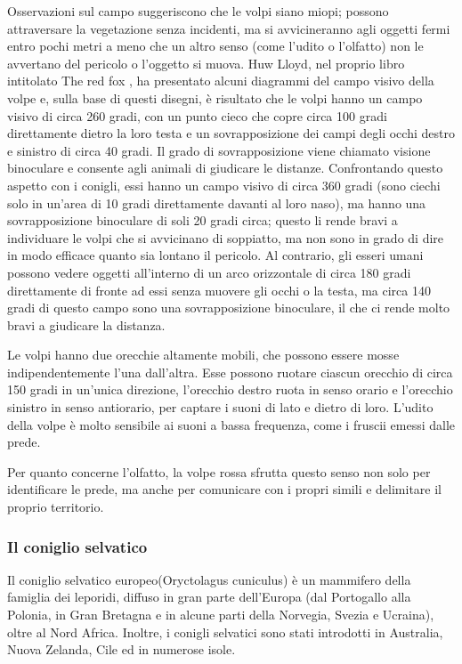 \documentclass[11pt]{article}
\begin{document}
Osservazioni sul campo\cite{RedFox} suggeriscono che le volpi siano miopi; possono attraversare la vegetazione senza incidenti, ma si avvicineranno agli oggetti fermi entro pochi metri a meno che un altro senso (come l'udito o l'olfatto) non le avvertano del pericolo o l'oggetto si muova. Huw Lloyd, nel proprio libro intitolato The red fox \cite{Zimen1980}, ha presentato alcuni diagrammi del campo visivo della volpe e, sulla base di questi disegni, è risultato che le volpi hanno un campo visivo di circa 260 gradi, con un punto cieco che copre circa 100 gradi direttamente dietro la loro testa e un sovrapposizione dei campi degli occhi destro e sinistro di circa 40 gradi. Il grado di sovrapposizione viene chiamato visione binoculare e consente agli animali di giudicare le distanze.
Confrontando questo aspetto con i conigli, essi hanno un campo visivo di circa 360 gradi (sono ciechi solo in un'area di 10 gradi direttamente davanti al loro naso), ma hanno una sovrapposizione binoculare di soli 20 gradi circa; questo li rende bravi a individuare le volpi che si avvicinano di soppiatto, ma non sono in grado di dire in modo efficace quanto sia lontano il pericolo. Al contrario, gli esseri umani possono vedere oggetti all'interno di un arco orizzontale di circa 180 gradi direttamente di fronte ad essi senza muovere gli occhi o la testa, ma circa 140 gradi di questo campo sono una sovrapposizione binoculare, il che ci rende molto bravi a giudicare la distanza.

Le volpi hanno due orecchie altamente mobili, che possono essere mosse indipendentemente l'una dall'altra. Esse possono ruotare ciascun orecchio di circa 150 gradi in un'unica direzione, l'orecchio destro ruota in senso orario e l'orecchio sinistro in senso antiorario, per captare i suoni di lato e dietro di loro. L'udito della volpe è molto sensibile ai suoni a bassa frequenza, come i fruscii emessi dalle prede. 

Per quanto concerne l'olfatto, la volpe rossa sfrutta questo senso non solo per identificare le prede, ma anche per comunicare con i propri simili e delimitare il proprio territorio.



\subsubsection{Il coniglio selvatico}
\label{coniglio}
Il coniglio selvatico\cite{WikiConiglio} europeo(Oryctolagus cuniculus) è un mammifero della famiglia dei leporidi, diffuso in gran parte dell'Europa (dal Portogallo alla Polonia, in Gran Bretagna e in alcune parti della Norvegia, Svezia e Ucraina), oltre al Nord Africa. Inoltre, i conigli selvatici sono stati introdotti in  Australia, Nuova Zelanda, Cile ed in numerose isole. 
\end{document}
